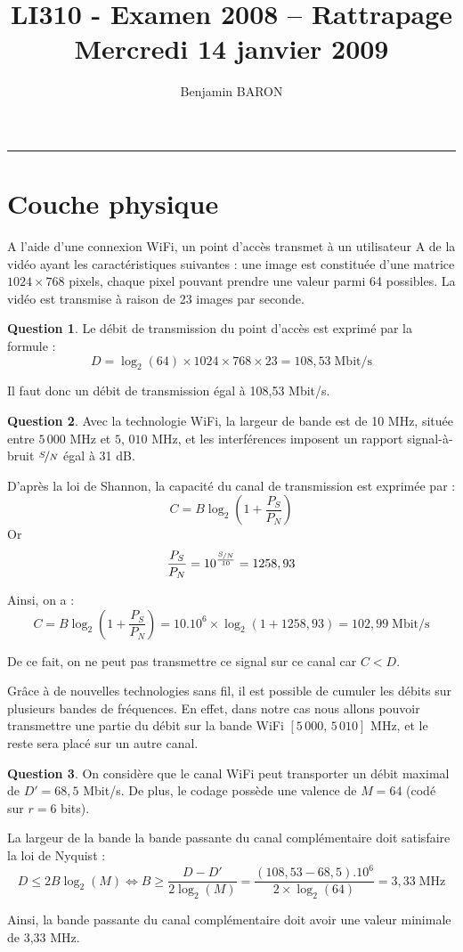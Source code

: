 \documentclass[11pt,english,french]{scrreprt}
\makeatletter
\theoremstyle{remark}
\theoremstyle{definition}
\newtheorem{ques}{Question}[section]
\renewcommand{\maketitle}{\begingroup%
    \let\footnotesize\small
    \let\footnoterule\relax
    \parindent \z@
    \reset@font
    \begin{flushleft}
      \huge \sffamily \bfseries\color{orange} \@title
    \end{flushleft}
    \hrule height 1pt
    \begin{flushright}
      \large\sffamily\color{MyDarkBlue}\@author
    \end{flushright}
  \endgroup%
  \setcounter{footnote}{0}%
}
\makeatother
\begin{document}
	
\title{LI310 - Examen 2008 -- Rattrapage\\
Mercredi 14 janvier 2009}
\author{Benjamin BARON}

\maketitle

\section{Couche physique} %

A l'aide d'une connexion WiFi, un point d'accès transmet à un utilisateur A de la vidéo ayant les caractéristiques suivantes : une image est constituée d'une matrice $1024\times 768$ pixels, chaque pixel pouvant prendre une valeur parmi 64 possibles. La vidéo est transmise à raison de 23 images par seconde.

\begin{ques}
	Le débit de transmission du point d'accès est exprimé par la formule :\[D=\log_2(64)\times 1024\times 768\times 23 = 108,53\;\textrm{Mbit/s}\]
	
	Il faut donc un débit de transmission égal à 108,53 Mbit/s.
\end{ques}

\begin{ques}
	Avec la technologie WiFi, la largeur de bande est de 10 MHz, située entre $5\,000$ MHz et $5,\,010$ MHz, et les interférences imposent un rapport signal-à-bruit $\nicefrac{S}{N}$ égal à 31 dB.
	
	D'après la loi de Shannon, la capacité du canal de transmission est exprimée par :\[C=B\log_2\left(1+\frac{P_S}{P_N}\right)\]
	Or \[\frac{P_S}{P_N}=10^{\frac{\nicefrac{S}{N}}{10}}=1258,93\]
	
	Ainsi, on a :\[C=B\log_2\left(1+\frac{P_S}{P_N}\right)=10.10^6\times\log_2(1+1258,93)=102,99\;\textrm{Mbit/s}\]
	
	De ce fait, on ne peut pas transmettre ce signal sur ce canal car $C < D$.
\end{ques}

Grâce à de nouvelles technologies sans fil, il est possible de cumuler les débits sur plusieurs bandes de fréquences. En effet, dans notre cas nous allons pouvoir transmettre une partie du débit sur la bande WiFi $[5\,000,\,5\,010]$ MHz, et le reste sera placé sur un autre canal.

\begin{ques}
	On considère que le canal WiFi peut transporter un débit maximal de $D'=68,5$ Mbit/s. De plus, le codage possède une valence de $M=64$ (codé sur $r=6$ bits).
	
	La largeur de la bande la bande passante du canal complémentaire doit satisfaire la loi de Nyquist : \[D\leqslant 2B\log_2(M)\Leftrightarrow B \geqslant \frac{D-D'}{2\log_2(M)} = \frac{(108,53-68,5).10^6}{2\times\log_2(64)}=3,33\;\textrm{MHz}\]
	
	Ainsi, la bande passante du canal complémentaire doit avoir une valeur minimale de 3,33 MHz.
\end{ques}
\end{document}
